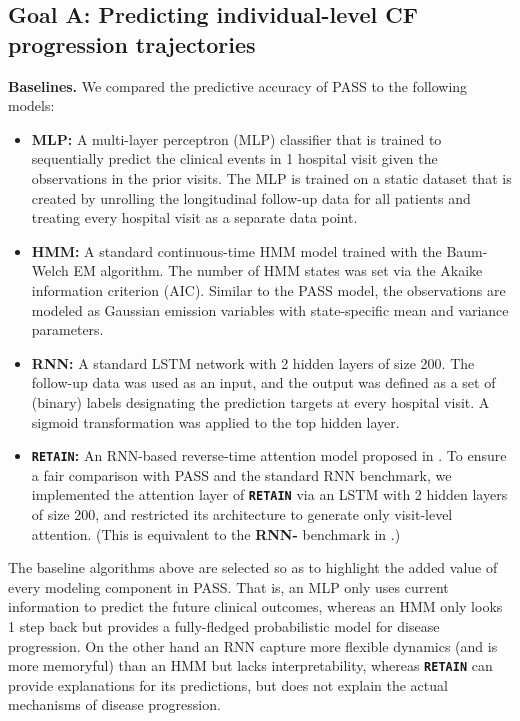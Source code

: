 \documentclass[twoside,11pt]{article}
\begin{document}
\subsection{{\bf Goal A}: Predicting individual-level CF progression trajectories}
\label{SSec51}
{\bf Baselines.} We compared the predictive accuracy of PASS to the following models:
\begin{itemize}
\item {\bf MLP:} A multi-layer perceptron (MLP) classifier that is trained to sequentially predict the clinical events in 1 hospital visit given the observations in the prior visits. The MLP is trained on a static dataset that is created by unrolling the longitudinal follow-up data for all patients and treating every hospital visit as a separate data point.
\item {\bf HMM:} A standard continuous-time HMM model \cite{wang2014unsupervised,liu2015efficient} trained with the Baum-Welch EM algorithm. The number of HMM states was set via the Akaike information criterion (AIC). Similar to the PASS model, the observations \mbox{\footnotesize } are modeled as Gaussian emission variables with state-specific mean and variance parameters.
\item {\bf RNN:} A standard LSTM network with 2 hidden layers of size 200. The follow-up data \mbox{\footnotesize } was used as an input, and the output was defined as a set of (binary) labels designating the prediction targets at every hospital visit. A sigmoid transformation was applied to the top hidden layer. 
\item {\bf {\textbf{\texttt{RETAIN}}}:} An RNN-based reverse-time attention model proposed in \cite{choi2016retain}. To ensure a fair comparison with PASS and the standard RNN benchmark, we implemented the attention layer of {\small \textbf{\texttt{RETAIN}}} via an LSTM with 2 hidden layers of size 200, and restricted its architecture to generate only visit-level attention. (This is equivalent to the {\bf RNN-} benchmark in \cite{choi2016retain}.)
\end{itemize}

The baseline algorithms above are selected so as to highlight the added value of every modeling component in PASS. That is, an MLP only uses current information to predict the future clinical outcomes, whereas an HMM only looks 1 step back but provides a fully-fledged probabilistic model for disease progression. On the other hand an RNN capture more flexible dynamics (and is more memoryful) than an HMM but lacks interpretability, whereas {\small {\textbf{\texttt{RETAIN}}}} can provide explanations for its predictions, but does not explain the actual mechanisms of disease progression. 
\end{document}
